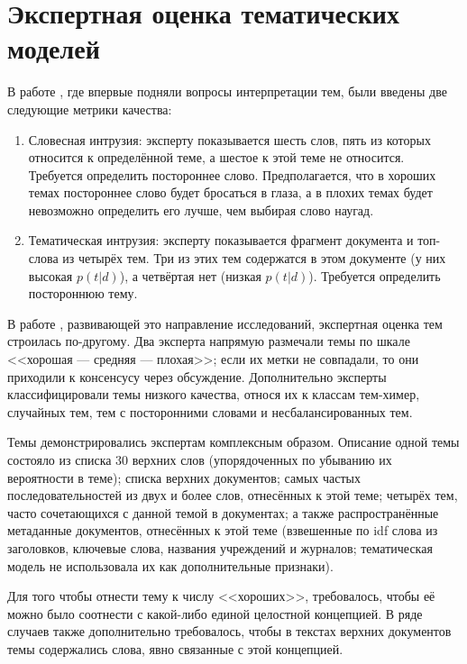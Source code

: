 \section{Экспертная оценка тематических моделей}

В работе \cite{rtl}, где впервые подняли вопросы интерпретации тем, были введены две следующие метрики качества:

\begin{enumerate}
\item{Словесная интрузия: эксперту показывается шесть слов, пять из которых относится к определённой теме, а шестое к этой теме не относится. Требуется определить постороннее слово. Предполагается, что в хороших темах постороннее слово будет бросаться в глаза, а в плохих темах будет невозможно определить его лучше, чем выбирая слово наугад.}
\item{Тематическая интрузия: эксперту показывается фрагмент документа и топ-слова из четырёх тем. Три из этих тем содержатся в этом документе (у них высокая $p(t|d)$), а четвёртая нет (низкая $p(t|d)$). Требуется определить постороннюю тему.}
\end{enumerate}

В работе \cite{mimno2011}, развивающей это направление исследований, экспертная оценка тем строилась по-другому. Два эксперта напрямую размечали темы по шкале <<хорошая --- средняя --- плохая>>; если их метки не совпадали, то они приходили к консенсусу через обсуждение. Дополнительно эксперты классифицировали темы низкого качества, относя их к классам тем-химер, случайных тем, тем с посторонними словами и несбалансированных тем.

Темы демонстрировались экспертам комплексным образом. Описание одной темы состояло из списка 30 верхних слов (упорядоченных по убыванию их вероятности в теме); списка верхних документов; самых частых последовательностей из двух и более слов, отнесённых к этой теме; четырёх тем, часто сочетающихся с данной темой в документах; а также распространённые метаданные документов, отнесённых к этой теме (взвешенные по idf слова из заголовков, ключевые слова, названия учреждений и журналов; тематическая модель не использовала их как дополнительные признаки).

Для того чтобы отнести тему к числу <<хороших>>, требовалось, чтобы её можно было соотнести с какой-либо единой целостной концепцией. В ряде случаев также дополнительно требовалось, чтобы в текстах верхних документов темы содержались слова, явно связанные с этой концепцией.

